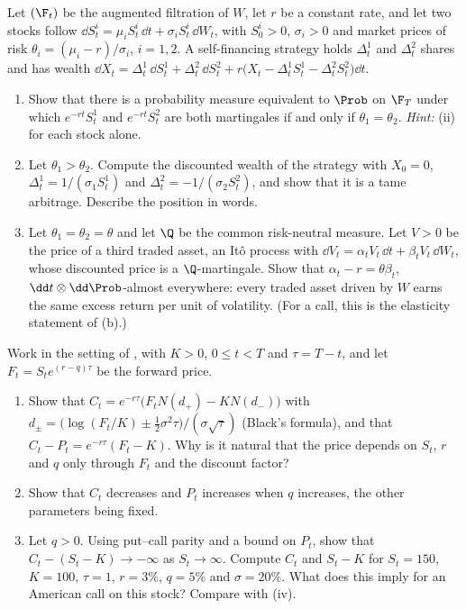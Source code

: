 \begin{exercise}\label{ex:rn-two-stocks}
\medium Let $(\F_t)$ be the augmented filtration of $W$, let $r$ be a constant rate, and let
two stocks follow $\dd S^i_t=\mu_iS^i_t\,\dd t+\sigma_iS^i_t\,\dd W_t$, with $S^i_0>0$,
$\sigma_i>0$ and market prices of risk $\theta_i=(\mu_i-r)/\sigma_i$, $i=1,2$. A self-financing
strategy holds $\Delta^1_t$ and $\Delta^2_t$ shares and has wealth
$\dd X_t=\Delta^1_t\,\dd S^1_t+\Delta^2_t\,\dd S^2_t+r\big(X_t-\Delta^1_tS^1_t-\Delta^2_tS^2_t\big)\dd t$.
\begin{enumerate}[label=(\alph*)]
  \item Show that there is a probability measure equivalent to $\Prob$ on $\F_T$ under which
    $e^{-rt}S^1_t$ and $e^{-rt}S^2_t$ are both martingales if and only if $\theta_1=\theta_2$.
    \emph{Hint:} (ii) for each stock alone.
  \item Let $\theta_1>\theta_2$. Compute the discounted wealth of the strategy with $X_0=0$,
    $\Delta^1_t=1/(\sigma_1S^1_t)$ and $\Delta^2_t=-1/(\sigma_2S^2_t)$, and show that it is a
    tame arbitrage. Describe the position in words.
  \item Let $\theta_1=\theta_2=\theta$ and let $\Q$ be the common risk-neutral measure. Let
    $V>0$ be the price of a third traded asset, an It\^o process with
    $\dd V_t=\alpha_tV_t\,\dd t+\beta_tV_t\,\dd W_t$, whose discounted price is a
    $\Q$-martingale. Show that $\alpha_t-r=\theta\beta_t$, $\dd t\otimes\dd\Prob$-almost
    everywhere: every traded asset driven by $W$ earns the same excess return per unit of
    volatility. (For a call, this is the elasticity statement of (b).)
\end{enumerate}
\end{exercise}

\begin{exercise}\label{ex:rn-dividends}
\easy Work in the setting of , with $K>0$, $0\le t<T$ and
$\tau=T-t$, and let $F_t=S_te^{(r-q)\tau}$ be the forward price.
\begin{enumerate}[label=(\alph*)]
  \item Show that $C_t=e^{-r\tau}\big(F_tN(d_+)-KN(d_-)\big)$ with
    $d_\pm=\big(\log(F_t/K)\pm\frac12\sigma^2\tau\big)/(\sigma\sqrt\tau)$ (Black's formula), and
    that $C_t-P_t=e^{-r\tau}(F_t-K)$. Why is it natural that the price depends on $S_t$, $r$
    and $q$ only through $F_t$ and the discount factor?
  \item Show that $C_t$ decreases and $P_t$ increases when $q$ increases, the other
    parameters being fixed.
  \item Let $q>0$. Using put--call parity and a bound on $P_t$, show that
    $C_t-(S_t-K)\to-\infty$ as $S_t\to\infty$. Compute $C_t$ and $S_t-K$ for $S_t=150$, $K=100$,
    $\tau=1$, $r=3\%$, $q=5\%$ and $\sigma=20\%$. What does this imply for an American call on
    this stock? Compare with (iv).
\end{enumerate}
\end{exercise}

